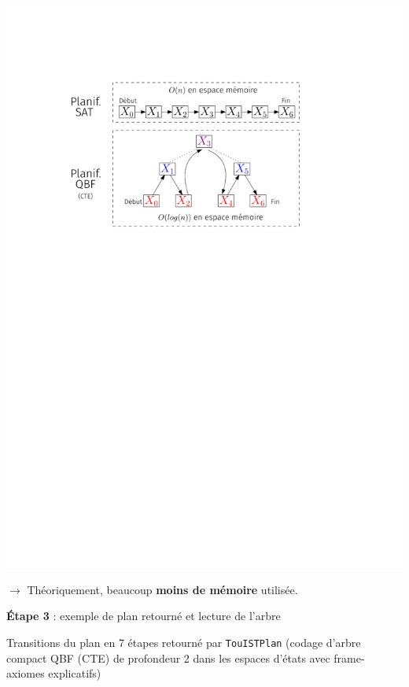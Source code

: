 \documentclass[english,french,usenames,dvipsnames]{beamer}
\newcommand{\touistplan}{{\sc \texttt {TouISTPlan}}\xspace}
\begin{document}
\begin{frame}{\subsecname}
\begin{center}\includegraphics[width=1\textwidth]{figures/coplas2018/planif-tree-3b.pdf}\end{center}
$\longrightarrow$ Théoriquement, beaucoup \textbf{moins de mémoire} utilisée.
\end{frame}


\begin{frame}{\subsecname}
\textbf{Étape 3} : exemple de plan retourné et lecture de l'arbre\\
\begin{figure}
\begin{footnotesize}\end{footnotesize}
\end{figure}
Transitions du plan en 7 étapes retourné par \touistplan{} (codage d'arbre compact QBF (CTE) de profondeur 2 dans les espaces d'états avec frame-axiomes explicatifs)
\end{frame}
\end{document}
